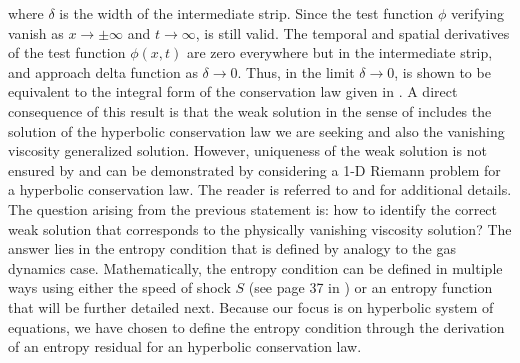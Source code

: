 where $\delta$ is the width of the intermediate strip. Since the test function $\phi$ verifying  vanish as $x \to \pm  \infty$ and $t \to \infty$,  is still valid. The temporal and spatial derivatives of the test function $\phi(x,t)$ are zero everywhere but in the intermediate strip, and approach delta function as $\delta \to 0$. Thus, in the limit $\delta \to 0$,  is shown to be equivalent to the integral form of the conservation law given in . A direct consequence of this result is that the weak solution in the sense of  includes the solution of the hyperbolic conservation law we are seeking and also the vanishing viscosity generalized solution. However, uniqueness of the weak solution is not ensured by  and can be demonstrated by considering a 1-D Riemann problem for a hyperbolic conservation law. The reader is referred to \cite{Toro} and \cite{Leveque} for additional details. The question arising from the previous statement is: how to identify the correct weak solution that corresponds to the physically vanishing viscosity solution? The answer lies in the entropy condition that is defined by analogy to the gas dynamics case. Mathematically, the entropy condition can be defined in multiple ways using either the speed of shock $S$ (see page 37 in \cite{Leveque}) or an entropy function that will be further detailed next. Because our focus is on hyperbolic system of equations, we have chosen to define the entropy condition through the derivation of an entropy residual for an hyperbolic conservation law. 

